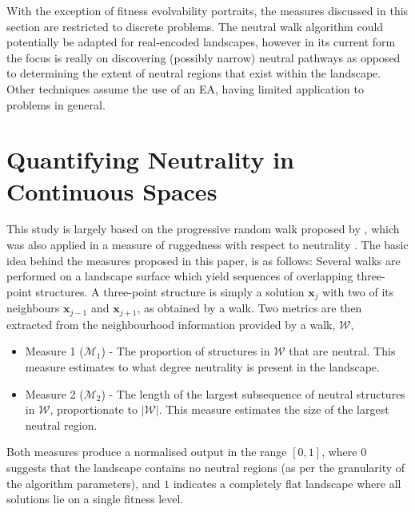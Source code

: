\documentclass[conference]{IEEEtran}
\renewcommand{\vec}[1]{\mathbf{#1}}
\begin{document}
With the exception of fitness evolvability portraits, the measures discussed in this section are restricted to discrete problems. The neutral walk algorithm could potentially be adapted for real-encoded landscapes, however in its current form the focus is really on discovering (possibly narrow) neutral pathways as opposed to determining the extent of neutral regions that exist within the landscape. Other techniques assume the use of an EA, having limited application to problems in general.

\section{Quantifying Neutrality in Continuous Spaces}
\label{continuousNeutrality}
This study is largely based on the progressive random walk proposed by \citet{malan2014progressive}, which was also applied in a measure of ruggedness with respect to neutrality \cite{malan2009quantifying}. The basic idea behind the measures proposed in this paper, is as follows: Several walks are performed on a landscape surface which yield sequences of overlapping three-point structures. A three-point structure is simply a solution $\vec{x}_j$ with two of its neighbours $\vec{x}_{j-1}$ and $\vec{x}_{j+1}$, as obtained by a walk. Two metrics are then extracted from the neighbourhood information provided by a walk, $\mathcal{W}$,

\begin{itemize}
	\item Measure 1 (${\mathcal{M}_1}$) - The proportion of structures in $\mathcal{W}$ that are neutral. This measure estimates to what degree neutrality is present in the landscape.
	\item Measure 2 (${\mathcal{M}_2}$) - The length of the largest subsequence of neutral structures in $\mathcal{W}$, proportionate to $\lvert \mathcal{W} \rvert$. This measure estimates the size of the largest neutral region.
\end{itemize}

Both measures produce a normalised output in the range $[0,1]$, where $0$ suggests that the landscape contains no neutral regions (as per the granularity of the algorithm parameters), and $1$ indicates a completely flat landscape where all solutions lie on a single fitness level.
\end{document}
